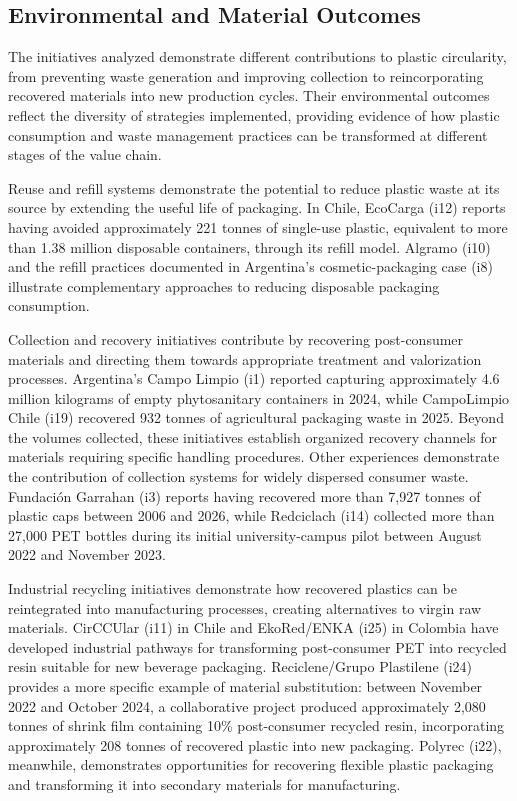 \documentclass[
  12pt,
  oneside]{book}
\begin{document}
\subsection{Environmental and Material
Outcomes}\label{environmental-and-material-outcomes}

The initiatives analyzed demonstrate different contributions to plastic
circularity, from preventing waste generation and improving collection
to reincorporating recovered materials into new production cycles. Their
environmental outcomes reflect the diversity of strategies implemented,
providing evidence of how plastic consumption and waste management
practices can be transformed at different stages of the value chain.

Reuse and refill systems demonstrate the potential to reduce plastic
waste at its source by extending the useful life of packaging. In Chile,
EcoCarga (i12) reports having avoided approximately 221 tonnes of
single-use plastic, equivalent to more than 1.38 million disposable
containers, through its refill model. Algramo (i10) and the refill
practices documented in Argentina's cosmetic-packaging case (i8)
illustrate complementary approaches to reducing disposable packaging
consumption.

Collection and recovery initiatives contribute by recovering
post-consumer materials and directing them towards appropriate treatment
and valorization processes. Argentina's Campo Limpio (i1) reported
capturing approximately 4.6 million kilograms of empty phytosanitary
containers in 2024, while CampoLimpio Chile (i19) recovered 932 tonnes
of agricultural packaging waste in 2025. Beyond the volumes collected,
these initiatives establish organized recovery channels for materials
requiring specific handling procedures. Other experiences demonstrate
the contribution of collection systems for widely dispersed consumer
waste. Fundación Garrahan (i3) reports having recovered more than 7,927
tonnes of plastic caps between 2006 and 2026, while Redciclach (i14)
collected more than 27,000 PET bottles during its initial
university-campus pilot between August 2022 and November 2023.

Industrial recycling initiatives demonstrate how recovered plastics can
be reintegrated into manufacturing processes, creating alternatives to
virgin raw materials. CirCCUlar (i11) in Chile and EkoRed/ENKA (i25) in
Colombia have developed industrial pathways for transforming
post-consumer PET into recycled resin suitable for new beverage
packaging. Reciclene/Grupo Plastilene (i24) provides a more specific
example of material substitution: between November 2022 and October
2024, a collaborative project produced approximately 2,080 tonnes of
shrink film containing 10\% post-consumer recycled resin, incorporating
approximately 208 tonnes of recovered plastic into new packaging.
Polyrec (i22), meanwhile, demonstrates opportunities for recovering
flexible plastic packaging and transforming it into secondary materials
for manufacturing.
\end{document}

